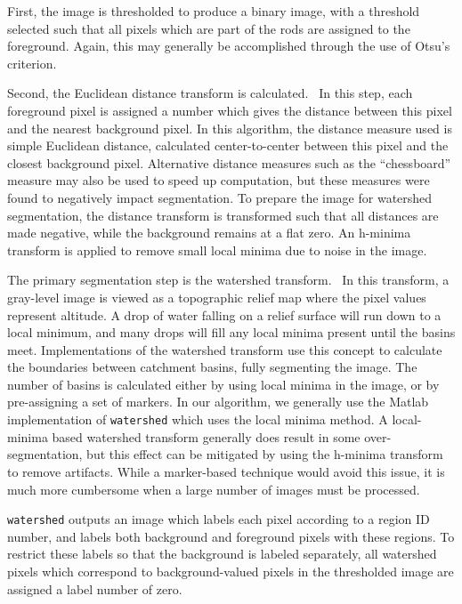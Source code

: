 First, the image is thresholded to produce a binary image, with a threshold selected such that all pixels which
are part of the rods are assigned to the foreground. Again, this may generally be accomplished through the use of 
Otsu's criterion.~\cite{otsu-threshold}

Second, the Euclidean distance transform is 
calculated.~\cite{matlab-bwdist}  In this step, each foreground pixel is assigned a number which
gives the distance between this pixel and the nearest background pixel. In this algorithm, the distance measure used
is simple Euclidean distance, calculated center-to-center between this pixel and the closest background pixel.  Alternative
distance measures such as the ``chessboard'' measure may also be used to speed up computation, but these measures were
found to negatively impact segmentation.  To prepare the image for watershed segmentation, the distance 
transform is transformed such that all distances are made
negative, while the background remains at a flat zero. 
An h-minima transform is applied to remove small local minima
due to noise in the image.~\cite{soille-book}

The primary segmentation step is the watershed 
transform.~\cite{matlab-watershed} In this transform, a gray-level image is viewed as
a topographic relief map where the pixel values represent altitude. A drop of water falling on a relief 
surface will run down to a local minimum, and many drops will fill any 
local minima present until the basins meet.
Implementations of the watershed transform use this concept to calculate the boundaries between catchment basins,
fully segmenting the image.  The number of basins is calculated either by using local minima in the image, or by 
pre-assigning a set of markers.  In our algorithm, we generally use the Matlab implementation of \texttt{watershed} which
uses the local minima method.  A local-minima based watershed transform generally does result in some 
over-segmentation, but this effect can be mitigated by using the h-minima transform to remove 
artifacts.  While a marker-based technique would avoid this issue, it is much more cumbersome when a large number
of images must be processed.

\texttt{watershed} outputs an image which labels each pixel according to a region ID number, and labels both background
and foreground pixels with these regions. To restrict these labels so that the background is labeled separately, all 
watershed pixels which correspond to background-valued pixels in the thresholded image are assigned a label number of zero.

